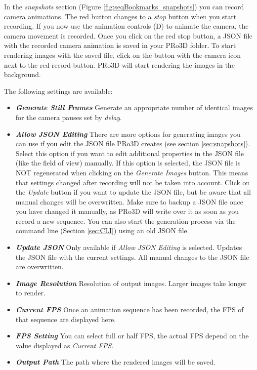 In the \emph{snapshots} section (Figure \ref{fig:seqBookmarks_snapshots}) you can record camera animations. The red button changes to a \emph{stop} button when you start recording. If you now use the animation controls (D) to animate the camera, the camera movement is recorded. Once you click on the red stop button, a JSON file with the recorded camera animation is saved in your PRo3D folder. To start rendering images with the saved file, click on the button with the camera icon next to the red record button. PRo3D will start rendering the images in the background.

The following settings are available:
\begin{itemize}
	\item \textbf{\emph{Generate Still Frames}} Generate an appropriate number of identical images for the camera pauses set by \emph{delay}.
	\item \textbf{\emph{Allow JSON Editing}} There are more options for generating images you can use if you edit the JSON file PRo3D creates (see section \ref{sec:snapshots}). Select this option if you want to edit additional properties in the JSON file (like the field of view) manually. If this option is selected, the JSON file is NOT regenerated when clicking on the \emph{Generate Images} button. This means that settings changed after recording will not be taken into account. Click on the \emph{Update} button if you want to update the JSON file, but be aware that all manual changes will be overwritten. Make sure to backup a JSON file once you have changed it manually, as PRo3D will write over it as soon as you record a new sequence. You can also start the generation process via the command line (Section \ref{sec:CLI}) using an old JSON file. 
	\item \textbf{\emph{Update JSON}} Only available if \emph{Allow JSON Editing} is selected. Updates the JSON file with the current settings. All manual changes to the JSON file are overwritten. 
	\item \textbf{\emph{Image Resolution}} Resolution of output images. Larger images take longer to render.
	\item \textbf{\emph{Current FPS}} Once an animation sequence has been recorded, the FPS of that sequence are displayed here.
	\item \textbf{\emph{FPS Setting}} You can select full or half FPS, the actual FPS depend on the value displayed as \emph{Current FPS}. 
	\item \textbf{\emph{Output Path}} The path where the rendered images will be saved.
\end{itemize}

